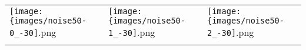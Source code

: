  \begin{tabular}{lll}
\texttt{[image: \{images/noise50-0\_-30]}.png} &\texttt{[image: \{images/noise50-1\_-30]}.png} &\texttt{[image: \{images/noise50-2\_-30]}.png} 
 \\ \hfill\end{tabular}